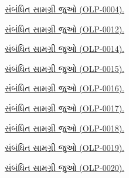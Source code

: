 \begingroup
\makeatletter{}\makeatother
\noindent\hyperref[guunit:OLP-0004]{સંબંધિત સામગ્રી જુઓ (OLP-0004).}\par
\endgroup


\begingroup
\makeatletter{}\makeatother

\label{guunit:OLP-0719}


\begingroup
\makeatletter{}\makeatother
\noindent\hyperref[guunit:OLP-0012]{સંબંધિત સામગ્રી જુઓ (OLP-0012).}\par
\endgroup


\begingroup
\makeatletter{}\makeatother
\noindent\hyperref[guunit:OLP-0014]{સંબંધિત સામગ્રી જુઓ (OLP-0014).}\par
\endgroup


\begingroup
\makeatletter{}\makeatother
\noindent\hyperref[guunit:OLP-0015]{સંબંધિત સામગ્રી જુઓ (OLP-0015).}\par
\endgroup


\begingroup
\makeatletter{}\makeatother
\noindent\hyperref[guunit:OLP-0016]{સંબંધિત સામગ્રી જુઓ (OLP-0016).}\par
\endgroup


\begingroup
\makeatletter{}\makeatother
\noindent\hyperref[guunit:OLP-0017]{સંબંધિત સામગ્રી જુઓ (OLP-0017).}\par
\endgroup


\begingroup
\makeatletter{}\makeatother
\noindent\hyperref[guunit:OLP-0018]{સંબંધિત સામગ્રી જુઓ (OLP-0018).}\par
\endgroup


\begingroup
\makeatletter{}\makeatother
\noindent\hyperref[guunit:OLP-0019]{સંબંધિત સામગ્રી જુઓ (OLP-0019).}\par
\endgroup


\OLEndChapterHook
\endgroup


\begingroup
\makeatletter{}\makeatother
\noindent\hyperref[guunit:OLP-0020]{સંબંધિત સામગ્રી જુઓ (OLP-0020).}\par
\endgroup


\begingroup
\makeatletter{}\makeatother

\label{guunit:OLP-0722}



